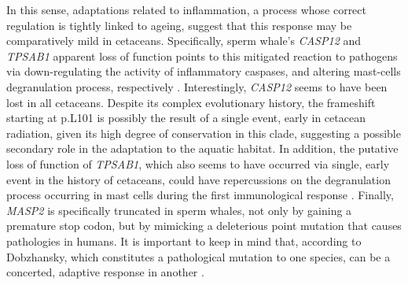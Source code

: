 In this sense, adaptations related to inflammation, a process whose correct regulation is tightly linked to ageing, suggest that this response may be comparatively mild in cetaceans.
Specifically, sperm whale's \textit{CASP12} and \textit{TPSAB1} apparent loss of function points to this mitigated reaction to pathogens via down-regulating the activity of inflammatory caspases, and altering mast-cells degranulation process, respectively \cite{Abdelmotelb2014,McIlwain2015}.
Interestingly, \textit{CASP12} seems to have been lost in all cetaceans.
Despite its complex evolutionary history, the frameshift starting at {p.L101} %
is possibly the result of a single event, early in cetacean radiation, given its high degree of conservation in this clade, suggesting a possible secondary role in the adaptation to the aquatic habitat. %
In addition, the putative loss of function of \textit{TPSAB1}, which also seems to have occurred via single, early event in the history of cetaceans, could have repercussions on the degranulation process occurring in mast cells during the first immunological response \cite{Wilcock2019}.
Finally, \textit{MASP2} is specifically truncated in sperm whales, not only by gaining a premature stop codon, but by mimicking a deleterious point mutation that causes pathologies in humans.%
It is important to keep in mind that, according to Dobzhansky, which constitutes a pathological mutation to one species, can be a concerted, adaptive response in another \cite{Dobzhansky1958}.
